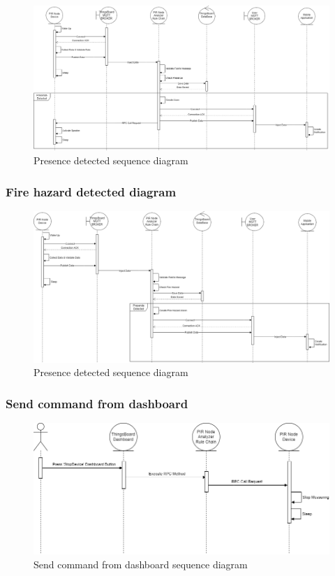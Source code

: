 \begin{figure}[H]
    \centering
    \includegraphics[width=1\textwidth]{./images/6/PresenceSequence.png}
    \caption{Presence detected sequence diagram}
\end{figure}

\subsubsection*{Fire hazard detected diagram}

\begin{figure}[H]
    \centering
    \includegraphics[width=1\textwidth]{./images/6/FireHazard.png}
    \caption{Presence detected sequence diagram}
\end{figure}

\subsubsection*{Send command from dashboard}

\begin{figure}[H]
    \centering
    \includegraphics[width=1\textwidth]{./images/6/SendCommandDashboard.png}
    \caption{Send command from dashboard sequence diagram}
\end{figure}


